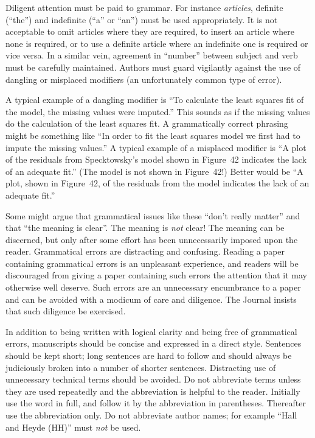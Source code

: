 \documentclass[times, doublespace]{anzsauth}
\begin{document}
Diligent attention must be paid to grammar.  For instance
\emph{articles}, definite (``the'') and indefinite (``a'' or
``an'') must be used appropriately.   It is not acceptable to omit
articles where they are required, to insert an article where none
is required, or to use a definite article where an indefinite one is
required or vice versa.  In a similar vein, agreement in ``number''
between subject and verb must be carefully maintained.  Authors must
guard vigilantly against the use of dangling or misplaced modifiers
(an unfortunately common type of error).

A typical example of a dangling modifier is ``To calculate the
least squares fit of the model, the missing values were imputed.''
This sounds as if the missing values do the calculation of the
least squares fit.  A grammatically correct phrasing might be
something like ``In order to fit the least squares model we
first had to impute the missing values.''  A typical example of a
misplaced modifier is ``A plot of the residuals from Specktowsky's
model shown in Figure~42 indicates the lack of an adequate fit.''
(The model is not shown in Figure~42!)  Better would be ``A plot,
shown in Figure~42, of the residuals from the model indicates the
lack of an adequate fit.''

Some might argue that grammatical issues like these ``don't
really matter'' and that ``the meaning is clear''.  The meaning is
\emph{not} clear!  The meaning can be discerned, but only after some
effort has been unnecessarily imposed upon the reader.  Grammatical
errors are distracting and confusing.  Reading a paper containing
grammatical errors is an unpleasant experience, and readers will be
discouraged from giving a paper containing such errors the attention
that it may otherwise well deserve.  Such errors are an unnecessary
encumbrance to a paper and can be avoided with a modicum of care
and diligence.  The Journal insists that such diligence be exercised.

In addition to being written with logical clarity and being free
of grammatical errors, manuscripts should be concise and expressed
in a direct style. Sentences should be kept short; long sentences
are hard to follow and should always be judiciously broken into
a number of shorter sentences.  Distracting use of unnecessary
technical terms should be avoided.  Do not abbreviate terms
unless they are used repeatedly and the abbreviation is helpful
to the reader. Initially use the word in full, and follow it by
the abbreviation in parentheses.  Thereafter use the abbreviation
only. Do not abbreviate author names; for example ``Hall and Heyde
(HH)'' must \emph{not} be used.
\end{document}
